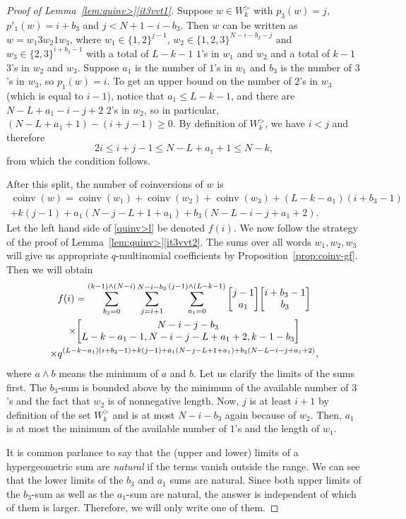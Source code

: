 \documentclass[ALCO,Unicode]{cedram}
\DeclareMathOperator{\coinv}{coinv}
\newcommand{\qbinom}[2]{\bgroup\renewcommand*{\arraystretch}{1}\begin{bmatrix} #1 \\ #2\end{bmatrix} \egroup}
\begin{document}
\begin{proof}[Proof of Lemma~\ref{lem:quinv>}\ref{it3vvt1}]
Suppose $w \in  W_k^>$ with $p_3(w) = j$, $p'_1(w) = i+b_3$ and $j < N+1 - i-b_3$. Then
$w$ can be written as $w = w_1 3 w_2 1 w_3$, where $w_1 \in \{1,2\}^{j-1}$, $w_2 \in \{1,2,3\}^{N-i-b_3-j}$ 
and $w_3 \in \{2,3\}^{i+b_3-1}$ with a total of $L-k-1$ $1$'s in $w_1$ and $w_2$ and a total of
$k-1$ $3$'s in $w_2$ and $w_3$. 
Suppose $a_1$ is the number of $1$'s in $w_1$ and $b_3$ is the number of $3$'s in $w_3$, so $p_1(w) = i$. To get an upper bound on the number of $2$'s in $w_3$ (which is equal to $i-1$), notice that $a_1 \leq L-k-1$, and there are $N-L+a_1-i-j+2$ $2$'s in $w_2$, so in particular, $(N-L+a_1+1) -(i+j-1) \geq 0$. By definition of $W_k^>$, we have $i < j$ and therefore
\[
2i \leq i+j-1 \leq N - L + a_1 + 1 \leq N - k,
\]
from which the condition follows.

After this split, the number of coinversions of $w$ is
\begin{multline*}
\coinv(w) = \coinv(w_1) + \coinv(w_2) +\coinv(w_3) + (L-k-a_1)(i+b_3-1)  \\
+ k(j-1) + a_1(N-j-L+1+a_1) + b_3(N-L-i-j+a_1+2).
\end{multline*}
Let the left hand side of \eqref{quinv>l} be denoted $f(i)$.
We now follow the strategy of the proof of Lemma~\ref{lem:quinv>}\ref{it3vvt2}. The sums over all
words $w_1, w_2, w_3$ will give us appropriate $q$-multinomial coefficients by 
Proposition~\ref{prop:coinv-gf}. Then we will obtain
\begin{multline*}
f(i) =  \sum_{b_3 = 0}^{(k-1) \wedge (N-i)}   \sum_{j=i+1}^{N-i-b_3}  \sum_{a_1 = 0}^{(j-1) \wedge (L-k-1)} 
\qbinom {j-1}{a_1} \qbinom{i+b_3-1}{b_3}\\
\times \qbinom {N-i-j-b_3}{L-k-a_1-1, N-i-j-L+a_1+2,k-1-b_3} \\
\times q^{(L-k-a_1)(i+b_3-1) + k(j-1) + a_1(N-j-L+1+a_1) + b_3(N-L-i-j+a_1+2)},
\end{multline*}
where $a \wedge b$ means the minimum of $a$ and $b$.
Let us clarify the limits of the sums first. 
The $b_3$-sum is bounded above by the minimum
of the available number of $3$'s and the fact that $w_2$ is of nonnegative length. 
Now, $j$ is at least $i+1$ by definition of the set 
$W_k^>$ and is at most $N-i-b_3$ again because of $w_2$.
Then, $a_1$ is at most the minimum of the available number of $1$'s and the length
of $w_1$.

It is common parlance to say that the (upper and lower) limits of a hypergeometric sum are \emph{natural} if the terms vanish outside the range. We can see that the lower limits of the $b_3$ and $a_1$ sums are natural. Since both upper limits of the $b_3$-sum as well as the $a_1$-sum are natural, the answer is independent of which of them is larger. Therefore, we will only write one of them.


\end{proof}
\end{document}
